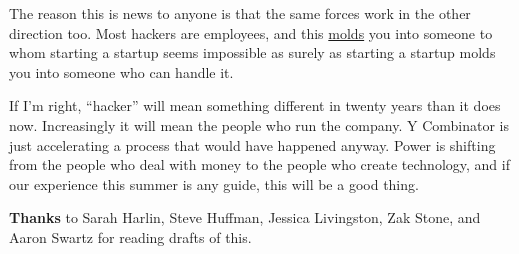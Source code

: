 The reason this is news to anyone is that the same forces work in the
other direction too. Most hackers are employees, and this
\href{http://software.ericsink.com/entries/No_Great_Hackers.html}{molds}
you into someone to whom starting a startup seems impossible as surely
as starting a startup molds you into someone who can handle it.

If I'm right, ``hacker'' will mean something different in twenty years
than it does now. Increasingly it will mean the people who run the
company. Y Combinator is just accelerating a process that would have
happened anyway. Power is shifting from the people who deal with money
to the people who create technology, and if our experience this summer
is any guide, this will be a good thing.


\textbf{Thanks} to Sarah Harlin, Steve Huffman, Jessica Livingston, Zak
Stone, and Aaron Swartz for reading drafts of this.